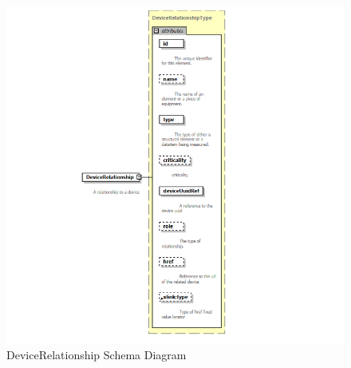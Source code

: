 \FloatBarrier


\begin{figure}[ht]
  \centering
    \includegraphics[width=1.0\textwidth]{figures/DeviceRelationship Schema.png}
  \caption{DeviceRelationship Schema Diagram}
  \label{fig:DeviceRelationship Schema Diagram}
\end{figure}

\FloatBarrier


